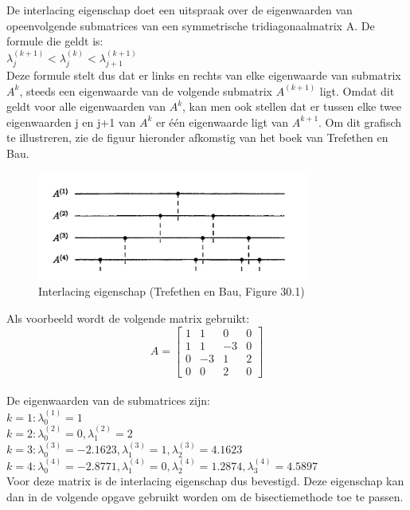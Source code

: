 De interlacing eigenschap doet een uitspraak over de eigenwaarden van opeenvolgende submatrices van een symmetrische tridiagonaalmatrix A. De formule die geldt is:\\[10pt]

$\lambda_{j}^{(k+1)} < \lambda_{j}^{(k)} < \lambda_{j+1}^{(k+1)}$\\[10pt]

Deze formule stelt dus dat er links en rechts van elke eigenwaarde van submatrix $A^{k}$, steeds een eigenwaarde van de volgende submatrix $A^{(k+1)}$ ligt. Omdat dit geldt voor alle eigenwaarden van $A^{k}$, kan men ook stellen dat er tussen elke twee eigenwaarden j en j+1 van $A^{k}$ er één eigenwaarde ligt van $A^{k+1}$. Om dit grafisch te illustreren, zie de figuur hieronder afkomstig van het boek van Trefethen en Bau.\\

\begin{figure}[!tbp]
\includegraphics[width=0.8\textwidth]{Tekeningen/Interlacing.png}
  \centering
  \caption{Interlacing eigenschap (Trefethen en Bau, Figure 30.1)}
\end{figure}

Als voorbeeld wordt de volgende matrix gebruikt:\\

\[
A= 
\begin{bmatrix}
    1 & 1 & 0 & 0\\
    1 & 1 & -3 & 0\\
    0 & -3 & 1 & 2\\
    0 & 0 & 2 & 0
\end{bmatrix}
\]\\

De eigenwaarden van de submatrices zijn:\\

$k = 1: \lambda_{0}^{(1)} = 1$\\
$k = 2: \lambda_{0}^{(2)} = 0, \lambda_{1}^{(2)} = 2$\\
$k = 3: \lambda_{0}^{(3)} = -2.1623, \lambda_{1}^{(3)} = 1, \lambda_{2}^{(3)} = 4.1623$\\
$k = 4: \lambda_{0}^{(4)} = -2.8771, \lambda_{1}^{(4)} = 0, \lambda_{2}^{(4)} = 1.2874, \lambda_{3}^{(4)} = 4.5897$\\[10pt]

Voor deze matrix is de interlacing eigenschap dus bevestigd. Deze eigenschap kan dan in de volgende opgave gebruikt worden om de bisectiemethode toe te passen.\\

